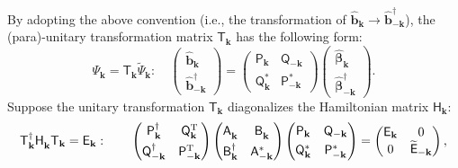 \documentclass[aps, prx, nofootinbib, superscriptaddress]{revtex4-2}
\newcommand{\kvec}{\mathbf{k}}
\begin{document}
By adopting the above convention (i.e., the transformation of $\hat{\bm b}_{\kvec} \rightarrow \hat{\bm b}^{\dagger}_{-\kvec}$), the (para)-unitary transformation matrix $\mathsf{T}_{\kvec}$ has the following form: 
\begin{equation}
    \Psi_{\kvec} = \mathsf{T}_{\kvec} \widetilde{\Psi}_{\kvec}: \quad
    \begin{pmatrix}
        \hat{\bm b}_{\kvec} \\
        \hat{\bm b}_{-\kvec}^{\dagger}
    \end{pmatrix}
    =
    \begin{pmatrix}
        \mathsf{P}_{\kvec}       & \mathsf{Q}_{-\kvec} \\ 
        \mathsf{Q}_{\kvec}^{*}   & \mathsf{P}_{-\kvec}^{*}
    \end{pmatrix}
    \begin{pmatrix}
        \hat{\bm \beta}_{ \kvec} \\
        \hat{\bm \beta}_{-\kvec}^{\dagger}
    \end{pmatrix}.
\end{equation}
Suppose the unitary transformation $\mathsf{T}_{\kvec}$ diagonalizes the Hamiltonian matrix $\mathsf{H}_{\kvec}$:
\begin{equation}
    \mathsf{T}_{\kvec}^{\dagger} \mathsf{H}_{\kvec}^{\phantom \dagger} \mathsf{T}_{\kvec} = \mathsf{E}_{\kvec}: \qquad
        \begin{pmatrix}
        \mathsf{P}_{\kvec}^{\dagger}     & \mathsf{Q}_{  \kvec}^{\rm T} \\[0.3em] 
        \mathsf{Q}_{-\kvec}^{\dagger}    & \mathsf{P}_{- \kvec}^{\rm T}
    \end{pmatrix}
    \begin{pmatrix}
        \mathsf{A}^{\phantom \dagger}_{\kvec}      &   \mathsf{B}^{\phantom \dagger}_{\kvec}\\[0.3em] 
        \mathsf{B}^\dagger_{\kvec}                 &   \mathsf{A}^*_{-\kvec}
    \end{pmatrix}
    \begin{pmatrix}
        \mathsf{P}_{\kvec}       & \mathsf{Q}_{-\kvec} \\[0.3em] 
        \mathsf{Q}_{\kvec}^{*}   & \mathsf{P}_{-\kvec}^{*}
    \end{pmatrix}
    =
    \begin{pmatrix}
        \mathsf{E}_{\kvec} & 0 \\ 0 & \widetilde{\mathsf{E}}_{-\kvec}
    \end{pmatrix},
\end{equation}
\end{document}
